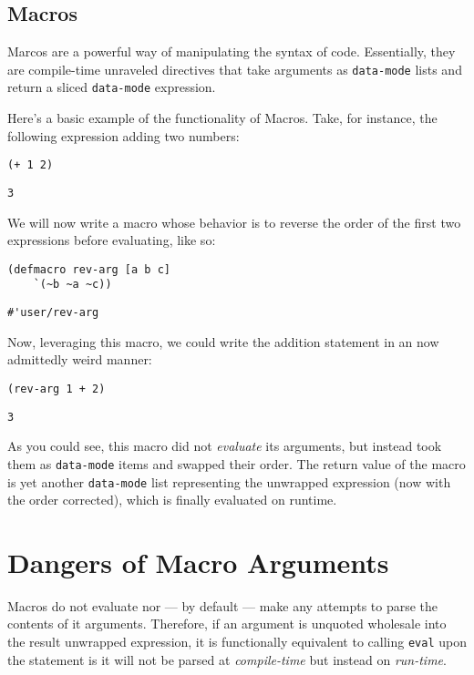\documentclass[letterpaper]{article}
\begin{document}
\subsection{Macros}
\label{sec:orge25f854}
Marcos are a powerful way of manipulating the syntax of code. Essentially, they are compile-time unraveled directives that take arguments as \texttt{data-mode} lists and return a sliced \texttt{data-mode} expression.

Here's a basic example of the functionality of Macros. Take, for instance, the following expression adding two numbers:

\begin{verbatim}
(+ 1 2)
\end{verbatim}

\begin{verbatim}
3
\end{verbatim}


We will now write a macro whose behavior is to reverse the order of the first two expressions before evaluating, like so:

\begin{verbatim}
(defmacro rev-arg [a b c]
    `(~b ~a ~c))
\end{verbatim}

\begin{verbatim}
#'user/rev-arg
\end{verbatim}


Now, leveraging this macro, we could write the addition statement in an now admittedly weird manner:

\begin{verbatim}
(rev-arg 1 + 2)
\end{verbatim}

\begin{verbatim}
3
\end{verbatim}


As you could see, this macro did not \emph{evaluate} its arguments, but instead took them as \texttt{data-mode} items and swapped their order. The return value of the macro is yet another \texttt{data-mode} list representing the unwrapped expression (now with the order corrected), which is finally evaluated on runtime.

\section{Dangers of Macro Arguments}
\label{sec:orgaad1ea0}
Macros do not evaluate nor --- by default --- make any attempts to parse the contents of it arguments. Therefore, if an argument is unquoted wholesale into the result unwrapped expression, it is functionally equivalent to calling \texttt{eval} upon the statement is it will not be parsed at \emph{compile-time} but instead on \emph{run-time}.
\end{document}
